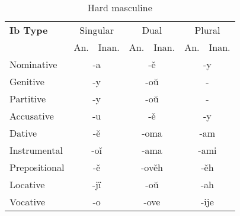 \begin{table}[!htb]
	\caption{Hard masculine}
	\begin{tabular}{lllllll}
		\textbf{Ib Type}       
		& \multicolumn{2}{c}{Singular} 
		& \multicolumn{2}{c}{Dual} 
		& \multicolumn{2}{c}{Plural} \\
		& An.   & Inan.  & An.   & Inan.   & An.  & Inan. \\
		Nominative    & \multicolumn{2}{c}{-a}      
		& \multicolumn{2}{c}{-ě}        
		& \multicolumn{2}{c}{-y} \\
		Genitive      & \multicolumn{2}{c}{-y}       
		& \multicolumn{2}{c}{-oŭ}      
		& \multicolumn{2}{c}{-}   \\
		Partitive     & \multicolumn{2}{c}{-y}       
		& \multicolumn{2}{c}{-oŭ}      
		& \multicolumn{2}{c}{-} \\
		Accusative    & \multicolumn{2}{c}{-u}       
		& \multicolumn{2}{c}{-ě}
		& \multicolumn{2}{c}{-y} \\
		Dative        & \multicolumn{2}{c}{-ě}       
		& \multicolumn{2}{c}{-oma}     
		& \multicolumn{2}{c}{-am} \\
		Instrumental  & \multicolumn{2}{c}{-oǐ}     
		& \multicolumn{2}{c}{-ama}     
		& \multicolumn{2}{c}{-ami} \\
		Prepositional & \multicolumn{2}{c}{-ě}       
		& \multicolumn{2}{c}{-ověh}     
		& \multicolumn{2}{c}{-ěh} \\
		Locative      & \multicolumn{2}{c}{-jï}      
		& \multicolumn{2}{c}{-oŭ}       
		& \multicolumn{2}{c}{-ah} \\ 
		Vocative      & \multicolumn{2}{c}{-o}       
		& \multicolumn{2}{c}{-ove}      
		& \multicolumn{2}{c}{-ije}
	\end{tabular}
\end{table}

